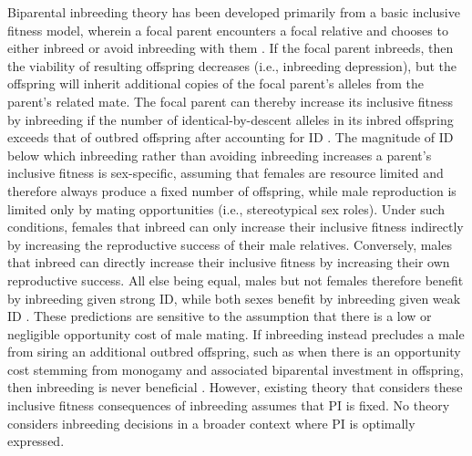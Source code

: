 \documentclass[12pt]{article}
\begin{document}
Biparental inbreeding theory has been developed primarily from a basic inclusive fitness model, wherein a focal parent encounters a focal relative and chooses to either inbreed or avoid inbreeding with them \cite[e.g.,][]{Parker1979, Parker2006, Kokko2006, Duthie2015a}. If the focal parent inbreeds, then the viability of resulting offspring decreases (i.e., inbreeding depression), but the offspring will inherit additional copies of the focal parent's alleles from the parent's related mate. The focal parent can thereby increase its inclusive fitness by inbreeding if the number of identical-by-descent alleles in its inbred offspring exceeds that of outbred offspring after accounting for ID \cite[][]{Parker1979, Parker2006, Kokko2006, Szulkin2012, Duthie2015a}. The magnitude of ID below which inbreeding rather than avoiding inbreeding increases a parent's inclusive fitness is sex-specific, assuming that females are resource limited and therefore always produce a fixed number of offspring, while male reproduction is limited only by mating opportunities (i.e., stereotypical sex roles). Under such conditions, females that inbreed can only increase their inclusive fitness indirectly by increasing the reproductive success of their male relatives. Conversely, males that inbreed can directly increase their inclusive fitness by increasing their own reproductive success. All else being equal, males but not females therefore benefit by inbreeding given strong ID, while both sexes benefit by inbreeding given weak ID \cite[][]{Parker1979, Parker2006, Kokko2006, Duthie2015a}. These predictions are sensitive to the assumption that there is a low or negligible opportunity cost of male mating. If inbreeding instead precludes a male from siring an additional outbred offspring, such as when there is an opportunity cost stemming from monogamy and associated biparental investment in offspring, then inbreeding is never beneficial \cite[][]{Waser1986}. However, existing theory that considers these inclusive fitness consequences of inbreeding assumes that PI is fixed. No theory considers inbreeding decisions in a broader context where PI is optimally expressed. %
\end{document}
